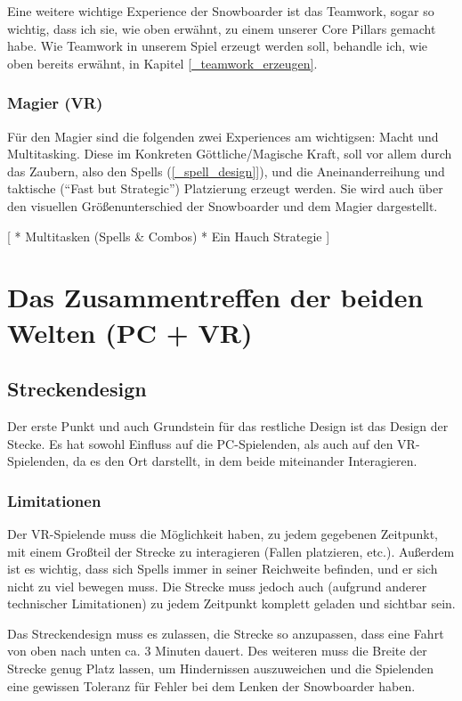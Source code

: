 Eine weitere wichtige Experience der Snowboarder ist das Teamwork, sogar so wichtig, dass ich sie, wie oben erwähnt, zu einem unserer Core Pillars gemacht habe. Wie Teamwork in unserem Spiel erzeugt werden soll, behandle ich, wie oben bereits erwähnt, in Kapitel \ref{_teamwork_erzeugen}.

\subsubsection{Magier (VR)}

Für den Magier sind die folgenden zwei Experiences am wichtigsen: Macht und Multitasking. Diese im Konkreten Göttliche/Magische Kraft, soll vor allem durch das Zaubern, also den Spells (\ref{_spell_design}]), und die Aneinanderreihung und taktische ("`Fast but Strategic"') Platzierung erzeugt werden. Sie wird auch über den visuellen Größenunterschied der Snowboarder und dem Magier dargestellt.

[
* Multitasken (Spells \& Combos)
* Ein Hauch Strategie
]

\section{Das Zusammentreffen der beiden Welten (PC + VR)}

\subsection{Streckendesign}

Der erste Punkt und auch Grundstein für das restliche Design ist das Design der Stecke. Es hat sowohl Einfluss auf die PC-Spielenden, als auch auf den VR-Spielenden, da es den Ort darstellt, in dem beide miteinander Interagieren.

\subsubsection{Limitationen}

Der VR-Spielende muss die Möglichkeit haben, zu jedem gegebenen Zeitpunkt, mit einem Großteil der Strecke zu interagieren (Fallen platzieren, etc.). Außerdem ist es wichtig, dass sich Spells immer in seiner Reichweite befinden, und er sich nicht zu viel bewegen muss. Die Strecke muss jedoch auch (aufgrund anderer technischer Limitationen) zu jedem Zeitpunkt komplett geladen und sichtbar sein.

Das Streckendesign muss es zulassen, die Strecke so anzupassen, dass eine Fahrt von oben nach unten ca. 3 Minuten dauert. Des weiteren muss die Breite der Strecke genug Platz lassen, um Hindernissen auszuweichen und die Spielenden eine gewissen Toleranz für Fehler bei dem Lenken der Snowboarder haben.

